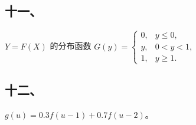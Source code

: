\documentclass[UTF8,12pt]{ctexart}
\begin{document}
\subsection*{十一、}

\(\displaystyle Y=F(X)\) 的分布函数 \(\displaystyle G(y)=\begin{cases}0,\allowbreak &y\le0,\allowbreak \\y,\allowbreak &0<y<1,\allowbreak \\1,\allowbreak &y\ge1.\end{cases}\)


\subsection*{十二、}

\(\displaystyle g(u)=0.3f(u-1)+0.7f(u-2)\)。
\end{document}
